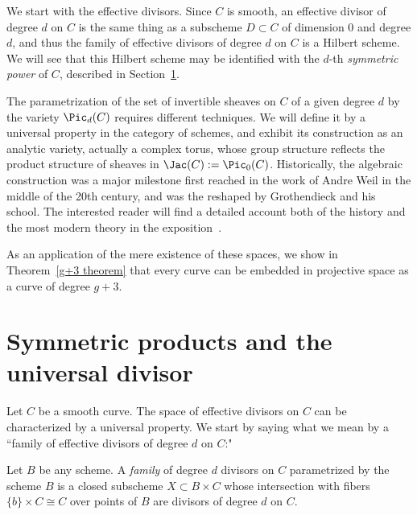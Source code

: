 
We start with the effective divisors. Since $C$ is smooth, an effective divisor of degree $d$ on $C$ is the same thing as a subscheme $D \subset C$ of dimension 0 and degree $d$, and thus
the family of effective divisors of degree $d$ on $C$ is a Hilbert scheme. We will see that this Hilbert scheme may be identified with
the $d$-th \emph{symmetric power}  of $C$, described in Section~\ref{symmetric section}. 

The parametrization of the set of invertible sheaves on $C$ of a given degree $d$ by the variety $\Pic_d(C)$ requires different techniques. We will define it by a universal property in the category of schemes, and exhibit its construction as an analytic variety, actually a complex torus, whose group structure reflects the product structure of
sheaves in $\Jac(C) := \Pic_0(C)$.
Historically, the algebraic construction was a major milestone first reached in the work of Andre Weil in the middle of
the 20th century, and was the reshaped by Grothendieck and his school. The interested reader will find a detailed account both of the history and the most
modern theory in the exposition~\cite{Kleiman-PicardScheme}.

As an application of the mere existence of these spaces, we show in Theorem~\ref{g+3 theorem} that every curve can be embedded in projective space as a curve of degree $g+3$.

\section{Symmetric products and the universal divisor}\label{symmetric section}

Let $C$ be a smooth curve. The space of effective divisors on $C$ can be characterized by a universal property. We start by saying what we mean by a ``family of effective divisors of degree $d$ on $C$:"

\begin{definition}
Let $B$ be any scheme. A \emph{family} of degree $d$ divisors on $C$ parametrized by the scheme $B$ is a closed subscheme $X\subset B\times C$ whose intersection with fibers $\{b\} \times C \cong C$ over points of $B$ are divisors of degree $d$ on $C$.
\end{definition}


